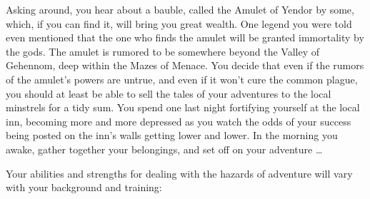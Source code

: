 Asking around, you hear about a bauble, called the Amulet of Yendor by some,
which, if you can find it, will bring you great wealth.  One legend you were
told even mentioned that the one who finds the amulet will be granted
immortality by the gods.  The amulet is rumored to be somewhere beyond the
Valley of Gehennom, deep within the Mazes of Menace.  You decide that even if
the rumors of the amulet's powers are untrue, and even if it won't cure the
common plague, you should at least be able to sell the tales of your
adventures to the local minstrels for a tidy sum.  You spend one last night
fortifying yourself at the local inn, becoming more and more depressed as you
watch the odds of your success being posted on the inn's walls getting lower
and lower.  In the morning you awake, gather together your belongings, and
set off on your adventure \ldots

Your abilities and strengths for dealing with the hazards of adventure
will vary with your background and training:

